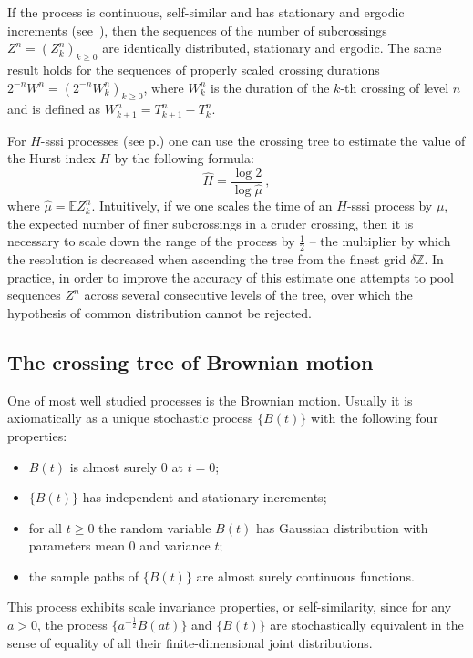 \documentclass[a4paper]{article}
\newcommand{\ex}{\mathbb{E}}
\begin{document}
If the process is continuous, self-similar and has stationary and ergodic increments
(see~\cite{jonesshen2005}), then the sequences of the number of subcrossings $Z^n = (Z_k^n)_{k\geq 0}$
are identically distributed, stationary and ergodic. The same result holds for
the sequences of properly scaled crossing durations $2^{-n} W^n = (2^{-n} W_k^n)_{k\geq0}$,
where $W_k^n$ is the duration of the $k$-th crossing of level $n$ and is defined
as $W_{k+1}^n = T_{k+1}^n - T_k^n$.

For $H$-sssi processes (see p.\pageref{eq:def_ss}) one can use the crossing tree
to estimate the value of the Hurst index $H$ by the following formula:
\[ \hat{H} = \frac{\log 2}{\log \hat{\mu}} \,,\]
where $\hat{\mu} = \ex Z_k^n$. Intuitively, if we one scales the time of an $H$-sssi
process by $\mu$, the expected number of finer subcrossings in a cruder crossing,
then it is necessary to scale down the range of the process by $\tfrac{1}{2}$ --
the multiplier by which the resolution is decreased when ascending the tree from
the finest grid $\delta \mathbb{Z}$. In practice, in order to improve the accuracy of
this estimate one attempts to pool sequences $Z^n$ across several consecutive levels
of the tree, over which the hypothesis of common distribution cannot be rejected.


\subsection{The crossing tree of Brownian motion} %
\label{sub:the_crossing_tree_of_brownian_motion}

One of most well studied processes is the Brownian motion. Usually it is axiomatically
as a unique stochastic process $\bigl\{B(t)\bigr\}$ with the following four properties:
\begin{itemize}
    \item $B(t)$ is almost surely $0$ at $t=0$;
    \item $\{B(t)\}$ has independent and stationary increments;
    \item for all $t\geq 0$ the random variable $B(t)$ has Gaussian distribution with
    parameters mean $0$ and variance $t$;
    \item the sample paths of $\{B(t)\}$ are almost surely continuous functions.
\end{itemize}
This process exhibits scale invariance properties, or self-similarity, since for any
$a>0$, the process $\bigl\{a^{-\tfrac{1}{2}} B(at)\bigr\}$ and $\{B(t)\}$ are stochastically
equivalent in the sense of equality of all their finite-dimensional joint distributions.
\end{document}
